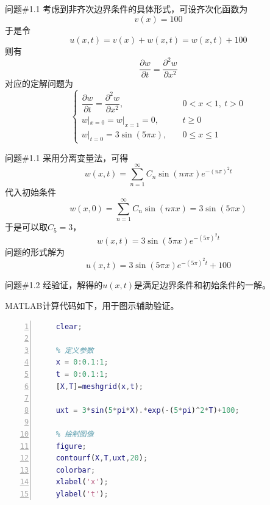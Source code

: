 \documentclass[12pt]{ctexart}
\begin{document}
    \begin{problem}{问题\#1.1}
        考虑到非齐次边界条件的具体形式，可设齐次化函数为
        $$
        v(x)=100
        $$
        于是令
        $$
        u(x,t)=v(x)+w(x,t)=w(x,t)+100
        $$
        则有
        $$
        \dfrac{\partial w}{\partial t}=\dfrac{\partial^2w}{\partial x^2}
        $$
        对应的定解问题为
        $$
        \begin{cases}
            \dfrac{\partial w}{\partial t}=\dfrac{\partial^2w}{\partial x^2},&\quad 0<x<1,\ t>0\\
            w|_{x=0}=w|_{x=1}=0,&\quad t\geqslant 0\\
            w|_{t=0}=3\sin(5\pi x),&\quad 0\leqslant x\leqslant 1
        \end{cases}
        $$
    \end{problem}
    \begin{problem}{问题\#1.1}
        采用分离变量法，可得
        $$
        w(x,t)=\sum^{\infty}_{n=1}C_n\sin(n\pi x)e^{-(n\pi)^2t}
        $$
        代入初始条件
        $$
        w(x,0)=\sum^{\infty}_{n=1}C_n\sin(n\pi x)=3\sin(5\pi x)
        $$
        于是可以取$C_5=3$，
        $$
        w(x,t)=3\sin(5\pi x)e^{-(5\pi)^2t}
        $$
        问题的形式解为
        $$
        u(x,t)=3\sin(5\pi x)e^{-(5\pi)^2t}
        +100
        $$
    \end{problem}
    \newpage
    \begin{problem}{问题\#1.2}
        经验证，解得的$u(x,t)$是满足边界条件和初始条件的一解。
    \end{problem}
    MATLAB计算代码如下，用于图示辅助验证。
    \begin{lstlisting}[language = Matlab,title={test6\_script.m},  numbers=left, 
        numberstyle=\tiny,keywordstyle=\color{blue!70},
        commentstyle=\color{red!50!green!50!blue!50},frame=shadowbox,
        rulesepcolor=\color{red!20!green!20!blue!20},basicstyle=\ttfamily]
    % 图示求解结果
    clear;
            
    % 定义参数
    x = 0:0.1:1;
    t = 0:0.1:1;
    [X,T]=meshgrid(x,t);
        
    uxt = 3*sin(5*pi*X).*exp(-(5*pi)^2*T)+100;
        
    % 绘制图像
    figure;
    contourf(X,T,uxt,20);
    colorbar;
    xlabel('x');
    ylabel('t');
    \end{lstlisting}
\end{document}

